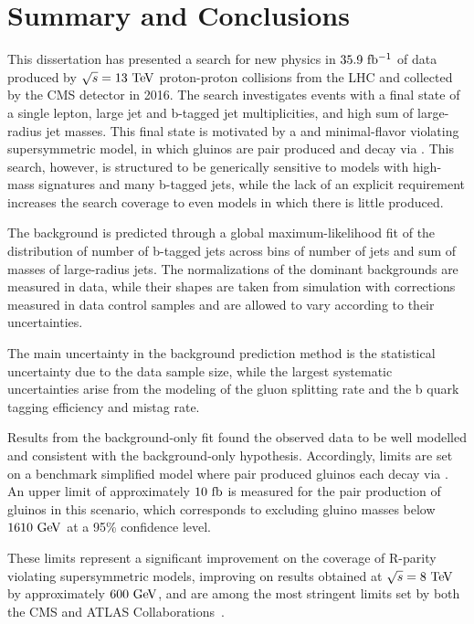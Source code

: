 \chapter{Summary and Conclusions}

This dissertation has presented a search for new physics in $35.9~\mathrm{fb^{-1}}$ of data produced by $\sqrt{s} = 13~\mathrm{Te\kern -0.1em V}$ proton-proton collisions from the LHC and collected by the CMS detector in 2016. 
The search investigates events with a final state of a single lepton, large jet and b-tagged jet multiplicities, and high sum of large-radius jet masses.
This final state is motivated by a \RP and minimal-flavor violating supersymmetric model, in which gluinos are pair produced and decay via \rpvDecay.
This search, however, is structured to be generically sensitive to models with high-mass signatures and many b-tagged jets, while the lack of an explicit \MET requirement increases the search coverage to even \RPC models in which there is little \MET produced.

The background is predicted through a global maximum-likelihood fit of the distribution of number of b-tagged jets across bins of number of jets and sum of masses of large-radius jets.
The normalizations of the dominant backgrounds are measured in data, while their shapes are taken from simulation with corrections measured in data control samples and are allowed to vary according to their uncertainties.

The main uncertainty in the background prediction method is the statistical uncertainty due to the data sample size, while the largest systematic uncertainties arise from the modeling of the gluon splitting rate and the b quark tagging efficiency and mistag rate.

Results from the background-only fit found the observed data to be well modelled and consistent with the background-only hypothesis.
Accordingly, limits are set on a benchmark simplified model where pair produced gluinos each decay via \smsDecay.
An upper limit of approximately $10~\mathrm{fb}$ is measured for the pair production of gluinos in this scenario, which corresponds to excluding gluino masses below $1610~\mathrm{Ge\kern -0.1em V}$ at a 95\% confidence level.

These limits represent a significant improvement on the coverage of R-parity violating supersymmetric models, improving on results obtained at $\sqrt{s} = 8~\mathrm{Te\kern -0.1em V}$~\cite{Khachatryan:2016iqn,Aad:2015lea} by approximately $600~\mathrm{Ge\kern -0.1em V}$, and are among the most stringent limits set by both the CMS and ATLAS Collaborations~\cite{Aaboud:2017faq,Aaboud:2018lpl}.

